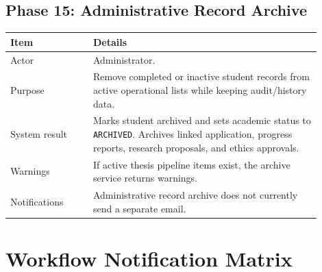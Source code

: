 \documentclass[11pt,a4paper]{article}
\newcommand{\status}[1]{\texttt{#1}}
\begin{document}
\subsection{Phase 15: Administrative Record Archive}

\begin{longtable}{p{0.24\linewidth} p{0.66\linewidth}}
\toprule
\textbf{Item} & \textbf{Details} \\
\midrule
Actor & Administrator. \\
Purpose & Remove completed or inactive student records from active operational lists while keeping audit/history data. \\
System result & Marks student archived and sets academic status to \status{ARCHIVED}. Archives linked application, progress reports, research proposals, and ethics approvals. \\
Warnings & If active thesis pipeline items exist, the archive service returns warnings. \\
Notifications & Administrative record archive does not currently send a separate email. \\
\bottomrule
\end{longtable}

\newpage

\section{Workflow Notification Matrix}
\end{document}

